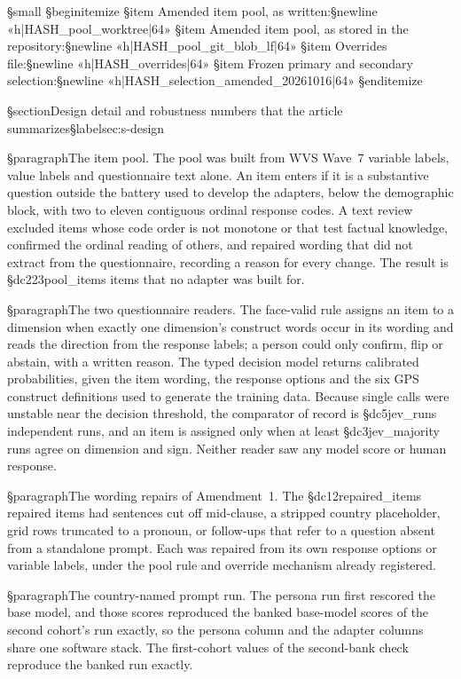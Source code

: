 {§small
§begin{itemize}
§item Amended item pool, as written:§newline «h|HASH_pool_worktree|64»
§item Amended item pool, as stored in the repository:§newline «h|HASH_pool_git_blob_lf|64»
§item Overrides file:§newline «h|HASH_overrides|64»
§item Frozen primary and secondary selection:§newline «h|HASH_selection_amended_20261016|64»
§end{itemize}}

§section{Design detail and robustness numbers that the article summarizes}§label{sec:s-design}

§paragraph{The item pool.} The pool was built from WVS Wave~7 variable labels, value labels and questionnaire text alone. An item enters if it is a substantive question outside the battery used to develop the adapters, below the demographic block, with two to eleven contiguous ordinal response codes. A text review excluded items whose code order is not monotone or that test factual knowledge, confirmed the ordinal reading of others, and repaired wording that did not extract from the questionnaire, recording a reason for every change. The result is §dc{223}{pool_items} items that no adapter was built for.

§paragraph{The two questionnaire readers.} The face-valid rule assigns an item to a dimension when exactly one dimension's construct words occur in its wording and reads the direction from the response labels; a person could only confirm, flip or abstain, with a written reason. The typed decision model returns calibrated probabilities, given the item wording, the response options and the six GPS construct definitions used to generate the training data. Because single calls were unstable near the decision threshold, the comparator of record is §dc{5}{jev_runs} independent runs, and an item is assigned only when at least §dc{3}{jev_majority} runs agree on dimension and sign. Neither reader saw any model score or human response.

§paragraph{The wording repairs of Amendment~1.} The §dc{12}{repaired_items} repaired items had sentences cut off mid-clause, a stripped country placeholder, grid rows truncated to a pronoun, or follow-ups that refer to a question absent from a standalone prompt. Each was repaired from its own response options or variable labels, under the pool rule and override mechanism already registered.

§paragraph{The country-named prompt run.} The persona run first rescored the base model, and those scores reproduced the banked base-model scores of the second cohort's run exactly, so the persona column and the adapter columns share one software stack. The first-cohort values of the second-bank check reproduce the banked run exactly.

